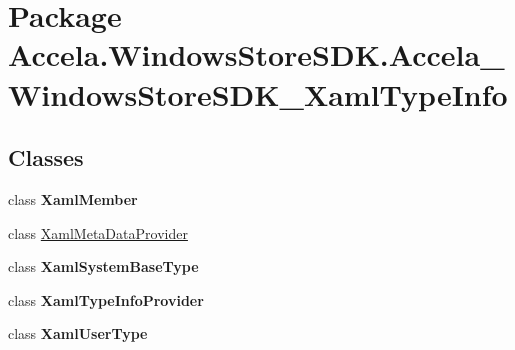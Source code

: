 \hypertarget{namespace_accela_1_1_windows_store_s_d_k_1_1_accela___windows_store_s_d_k___xaml_type_info}{\section{Package Accela.\+Windows\+Store\+S\+D\+K.\+Accela\+\_\+\+Windows\+Store\+S\+D\+K\+\_\+\+Xaml\+Type\+Info}
\label{namespace_accela_1_1_windows_store_s_d_k_1_1_accela___windows_store_s_d_k___xaml_type_info}
}
\subsection*{Classes}
\begin{DoxyCompactItemize}
\item 
class {\bfseries Xaml\+Member}
\item 
class \hyperlink{class_accela_1_1_windows_store_s_d_k_1_1_accela___windows_store_s_d_k___xaml_type_info_1_1_xaml_meta_data_provider}{Xaml\+Meta\+Data\+Provider}
\item 
class {\bfseries Xaml\+System\+Base\+Type}
\item 
class {\bfseries Xaml\+Type\+Info\+Provider}
\item 
class {\bfseries Xaml\+User\+Type}
\end{DoxyCompactItemize}
